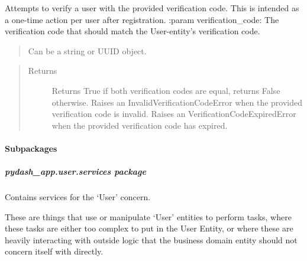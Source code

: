 \documentclass[letterpaper,10pt,english]{sphinxmanual}
\begin{document}
\begin{fulllineitems}
\begin{quote}
\begin{description}
\end{description}\end{quote}

\end{fulllineitems}


\begin{fulllineitems}
\label{\detokenize{pydash_app.user:pydash_app.user.verify}}
Attempts to verify a user with the provided verification code.
This is intended as a one-time action per user after registration.
:param verification\_code: The verification code that should match the User-entity’s verification code.
\begin{quote}

Can be a string or UUID object.
\end{quote}
\begin{quote}\begin{description}
\item[{Returns}] \leavevmode
Returns True if both verification codes are equal, returns False otherwise.
Raises an InvalidVerificationCodeError when the provided verification code is invalid.
Raises an VerificationCodeExpiredError when the provided verification code has expired.

\end{description}\end{quote}

\end{fulllineitems}



\paragraph{Subpackages}
\label{\detokenize{pydash_app.user:subpackages}}

\subparagraph{pydash\_app.user.services package}
\label{\detokenize{pydash_app.user.services::doc}}\label{\detokenize{pydash_app.user.services:module-pydash_app.user.services}}\label{\detokenize{pydash_app.user.services:pydash-app-user-services-package}}
Contains services for the ‘User’ concern.

These are things that use or manipulate ‘User’ entities to perform tasks,
where these tasks are either too complex to put in the User Entity,
or where these are heavily interacting with outside logic that the business domain entity should not concern itself with directly.
\end{document}
